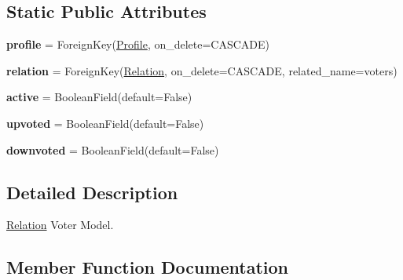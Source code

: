 \subsection*{Static Public Attributes}
\begin{DoxyCompactItemize}
\item 
\hypertarget{class_meanco_app_1_1models_1_1relation_1_1_relation_voter_af10865c4a64da5858e163453a3cf5b6d}{}\label{class_meanco_app_1_1models_1_1relation_1_1_relation_voter_af10865c4a64da5858e163453a3cf5b6d} 
{\bfseries profile} = Foreign\+Key(\hyperlink{class_meanco_app_1_1models_1_1profile_1_1_profile}{Profile}, on\+\_\+delete=C\+A\+S\+C\+A\+DE)
\item 
\hypertarget{class_meanco_app_1_1models_1_1relation_1_1_relation_voter_a1dbfd83760e499f61578235c1f7f6af9}{}\label{class_meanco_app_1_1models_1_1relation_1_1_relation_voter_a1dbfd83760e499f61578235c1f7f6af9} 
{\bfseries relation} = Foreign\+Key(\hyperlink{class_meanco_app_1_1models_1_1relation_1_1_relation}{Relation}, on\+\_\+delete=C\+A\+S\+C\+A\+DE, related\+\_\+name=\textquotesingle{}voters\textquotesingle{})
\item 
\hypertarget{class_meanco_app_1_1models_1_1relation_1_1_relation_voter_aa71d76c92f6d4e2a44410ccc2a2ce7da}{}\label{class_meanco_app_1_1models_1_1relation_1_1_relation_voter_aa71d76c92f6d4e2a44410ccc2a2ce7da} 
{\bfseries active} = Boolean\+Field(default=False)
\item 
\hypertarget{class_meanco_app_1_1models_1_1relation_1_1_relation_voter_ad049d01e61843b6c6fc529673c752371}{}\label{class_meanco_app_1_1models_1_1relation_1_1_relation_voter_ad049d01e61843b6c6fc529673c752371} 
{\bfseries upvoted} = Boolean\+Field(default=False)
\item 
\hypertarget{class_meanco_app_1_1models_1_1relation_1_1_relation_voter_a708f7ce98bce8ca85c6609d902e279ed}{}\label{class_meanco_app_1_1models_1_1relation_1_1_relation_voter_a708f7ce98bce8ca85c6609d902e279ed} 
{\bfseries downvoted} = Boolean\+Field(default=False)
\end{DoxyCompactItemize}


\subsection{Detailed Description}
\hyperlink{class_meanco_app_1_1models_1_1relation_1_1_relation}{Relation} Voter Model. 

\subsection{Member Function Documentation}
\hypertarget{class_meanco_app_1_1models_1_1relation_1_1_relation_voter_a5ebede60af8df31bbc92c1fe8008ab1c}{}\label{class_meanco_app_1_1models_1_1relation_1_1_relation_voter_a5ebede60af8df31bbc92c1fe8008ab1c} 
